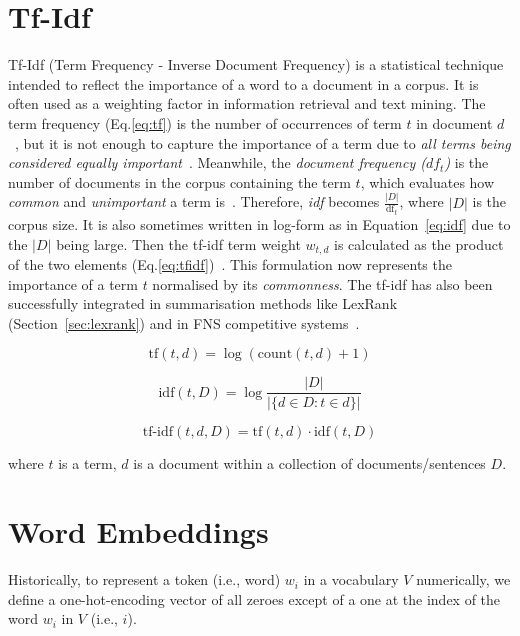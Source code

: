 \section{Tf-Idf}\label{sec:tfidf}
Tf-Idf (Term Frequency - Inverse Document Frequency) is a statistical technique intended to reflect the importance of a word to a document in a corpus.
It is often used as a weighting factor in information retrieval and text mining.
The term frequency (Eq.\ref{eq:tf}) is the number of occurrences of term $t$ in document $d$~\cite{luhn1957termfreq},
but it is not enough to capture the importance of a term due to \emph{all terms being considered equally important}~\cite{manning_raghavan_schutze_2008}.
Meanwhile, the \emph{document frequency ($df_{t}$)} is the number of documents in the corpus containing the term $t$,
which evaluates how \emph{common} and \emph{unimportant} a term is~\cite{leskovec_rajaraman_ullman_2020}.
Therefore, \emph{idf} becomes $\frac{|D|}{\text{df}_{t}}$, where $|D|$ is the corpus size.
It is also sometimes written in log-form as in Equation~\ref{eq:idf} due to the $|D|$ being large.
Then the tf-idf term weight $w_{t,d}$ is calculated as the product of the two elements (Eq.\ref{eq:tfidf})~\cite{jurafsky2000}.
This formulation now represents the importance of a term $t$ normalised by its \emph{commonness}.
The tf-idf has also been successfully integrated in summarisation methods like LexRank~\cite{Erkan2004LexRankGC} (Section~\ref{sec:lexrank})
and in FNS competitive systems~\cite{litvak2021tiber, el-haj-ogden-2022-financial}.

\begin{equation} \label{eq:tf}
    \text{tf}(t, d) = \log \left( \text{count}(t, d) + 1 \right)
\end{equation}

\begin{equation}\label{eq:idf}
    \text{idf}(t, D) = \log \frac{|D|}{|\{d \in D : t \in d\}|}
\end{equation}

\begin{equation}\label{eq:tfidf}
    \text{tf-idf}(t, d, D) = \text{tf}(t, d) \cdot \text{idf}(t, D)
\end{equation}

where $t$ is a term, $d$ is a document within a collection of documents/sentences $D$.

\section{Word Embeddings}\label{sec:word-embeddings}
Historically, to represent a token (i.e., word) $w_{i}$ in a vocabulary $V$ numerically, we define a one-hot-encoding vector of all zeroes except of a one at the index of the word $w_{i}$ in $V$ (i.e., $i$).

